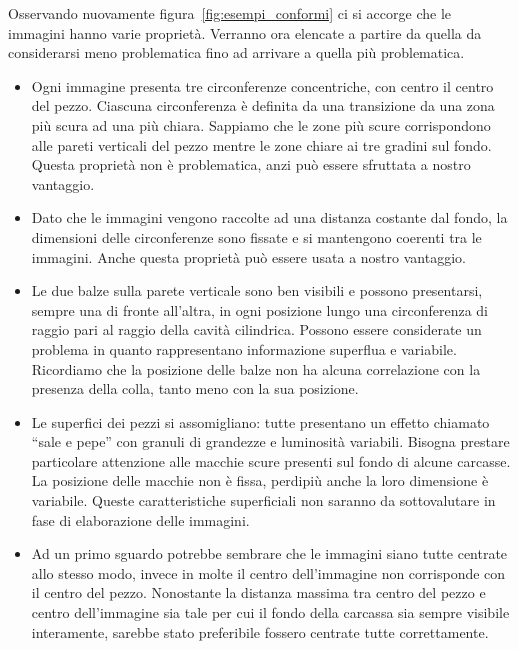 Osservando nuovamente figura~\ref{fig:esempi_conformi} ci si accorge che le immagini hanno varie proprietà.
Verranno ora elencate a partire da quella da considerarsi meno problematica fino ad arrivare a quella più problematica.
\begin{itemize}

  \item Ogni immagine presenta tre circonferenze concentriche, con centro il centro del pezzo.
    Ciascuna circonferenza è definita da una transizione da una zona più scura ad una più chiara.
    Sappiamo che le zone più scure corrispondono alle pareti verticali del pezzo mentre le zone chiare ai tre gradini sul fondo.
    Questa proprietà non è problematica, anzi può essere sfruttata a nostro vantaggio.

  \item Dato che le immagini vengono raccolte ad una distanza costante dal fondo, la dimensioni delle circonferenze sono fissate e si mantengono coerenti tra le immagini.
    Anche questa proprietà può essere usata a nostro vantaggio.

  \item Le due balze sulla parete verticale sono ben visibili e possono presentarsi, sempre una di fronte all'altra, in ogni posizione lungo una circonferenza di raggio pari al raggio della cavità cilindrica.
    Possono essere considerate un problema in quanto rappresentano informazione superflua e variabile.
    Ricordiamo che la posizione delle balze non ha alcuna correlazione con la presenza della colla, tanto meno con la sua posizione.

  \item Le superfici dei pezzi si assomigliano: tutte presentano un effetto chiamato ``sale e pepe'' con granuli di grandezze e luminosità variabili.
    Bisogna prestare particolare attenzione alle macchie scure presenti sul fondo di alcune carcasse.
    La posizione delle macchie non è fissa, perdipiù anche la loro dimensione è variabile.
    Queste caratteristiche superficiali non saranno da sottovalutare in fase di elaborazione delle immagini.

  \item Ad un primo sguardo potrebbe sembrare che le immagini siano tutte centrate allo stesso modo, invece in molte il centro dell'immagine non corrisponde con il centro del pezzo.
    Nonostante la distanza massima tra centro del pezzo e centro dell'immagine sia tale per cui il fondo della carcassa sia sempre visibile interamente, sarebbe stato preferibile fossero centrate tutte correttamente.
  

\end{itemize}
